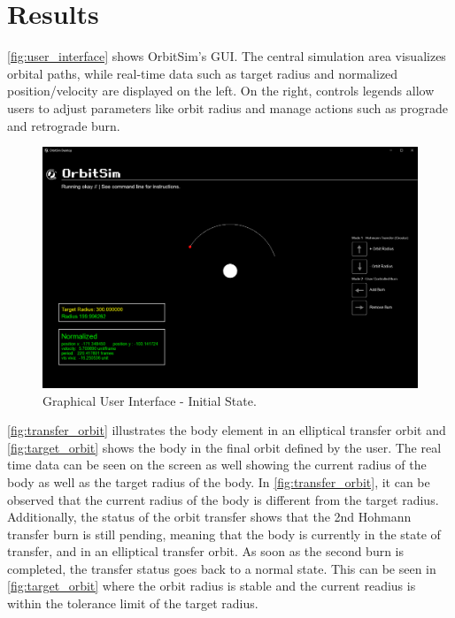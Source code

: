 \documentclass[12pt, letter]{article}
\begin{document}
\clearpage


\section{Results}


\autoref{fig:user_interface} shows OrbitSim’s GUI. The central simulation area visualizes orbital paths, while real-time data such as target radius and normalized position/velocity are displayed on the left. On the right, controls legends allow users to adjust parameters like orbit radius and manage actions such as prograde and retrograde burn.
\begin{figure}[H]
    \centering
    \includegraphics[width=0.99\linewidth]{figures/interface_1.png}
    \caption{Graphical User Interface - Initial State.}
    \label{fig:user_interface}
\end{figure}

\autoref{fig:transfer_orbit} illustrates the body element in an elliptical transfer orbit and \autoref{fig:target_orbit} shows the body in the final orbit defined by the user.
The real time data can be seen on the screen as well showing the current radius of the body as well as the target radius of the body. In \autoref{fig:transfer_orbit}, it can be observed that the current radius of the body is different from the target radius. Additionally, the status of the orbit transfer shows that the 2nd Hohmann transfer burn is still pending, meaning that the body is currently in the state of transfer, and in an elliptical transfer orbit. As soon as the second burn is completed, the transfer status goes back to a normal state. This can be seen in \autoref{fig:target_orbit} where the orbit radius is stable and the current readius is within the tolerance limit of the target radius.
\end{document}
